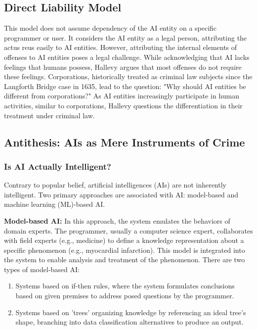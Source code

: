 \subsection{Direct Liability Model}
This model does not assume dependency of the AI entity on a specific programmer or user. It considers the AI entity as a legal person, attributing the actus reus easily to AI entities. However, attributing the internal elements of offenses to AI entities poses a legal challenge. While acknowledging that AI lacks feelings that humans possess, Hallevy argues that most offenses do not require these feelings. Corporations, historically treated as criminal law subjects since the Langforth Bridge case in 1635, lead to the question: "Why should AI entities be different from corporations?" As AI entities increasingly participate in human activities, similar to corporations, Hallevy questions the differentiation in their treatment under criminal law.

\subsection{Antithesis: AIs as Mere Instruments of Crime}

\subsubsection{Is AI Actually Intelligent?}

Contrary to popular belief, artificial intelligences (AIs) are not inherently intelligent. Two primary approaches are associated with AI: model-based and machine learning (ML)-based AI.

\textbf{Model-based AI:} In this approach, the system emulates the behaviors of domain experts. The programmer, usually a computer science expert, collaborates with field experts (e.g., medicine) to define a knowledge representation about a specific phenomenon (e.g., myocardial infarction). This model is integrated into the system to enable analysis and treatment of the phenomenon. There are two types of model-based AI:

\begin{enumerate}
    \item Systems based on if-then rules, where the system formulates conclusions based on given premises to address posed questions by the programmer.
    \item Systems based on 'trees' organizing knowledge by referencing an ideal tree's shape, branching into data classification alternatives to produce an output.
\end{enumerate}

